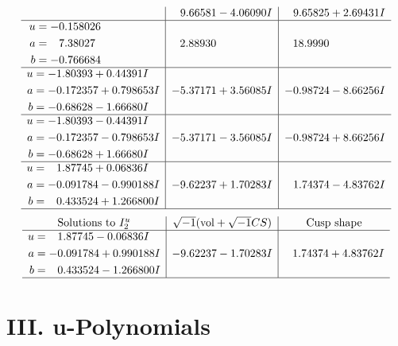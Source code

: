 \documentclass[1p]{elsarticle_modified}
\theoremstyle{definition}
\newcommand{\I}{\sqrt{-1}}
\begin{document}
$$\begin{array}{c|c|c}
 & \phantom{-}9.66581 - 4.06090 I & \phantom{-}9.65825 + 2.69431 I \\ \hline\begin{aligned}
u &= -0.158026\phantom{ +0.000000I} \\
a &= \phantom{-}7.38027\phantom{ +0.000000I} \\
b &= -0.766684\phantom{ +0.000000I}\end{aligned}
 & \phantom{-}2.88930\phantom{ +0.000000I} & \phantom{-}18.9990\phantom{ +0.000000I} \\ \hline\begin{aligned}
u &= -1.80393 + 0.44391 I \\
a &= -0.172357 + 0.798653 I \\
b &= -0.68628 - 1.66680 I\end{aligned}
 & -5.37171 + 3.56085 I & -0.98724 - 8.66256 I \\ \hline\begin{aligned}
u &= -1.80393 - 0.44391 I \\
a &= -0.172357 - 0.798653 I \\
b &= -0.68628 + 1.66680 I\end{aligned}
 & -5.37171 - 3.56085 I & -0.98724 + 8.66256 I \\ \hline\begin{aligned}
u &= \phantom{-}1.87745 + 0.06836 I \\
a &= -0.091784 - 0.990188 I \\
b &= \phantom{-}0.433524 + 1.266800 I\end{aligned}
 & -9.62237 + 1.70283 I & \phantom{-}1.74374 - 4.83762 I\\
 \hline 
 \end{array}$$\newpage$$\begin{array}{c|c|c}  
\text{Solutions to }I^u_{2}& \I (\text{vol} + \sqrt{-1}CS) & \text{Cusp shape}\\
 \hline 
\begin{aligned}
u &= \phantom{-}1.87745 - 0.06836 I \\
a &= -0.091784 + 0.990188 I \\
b &= \phantom{-}0.433524 - 1.266800 I\end{aligned}
 & -9.62237 - 1.70283 I & \phantom{-}1.74374 + 4.83762 I\\
 \hline 
 \end{array}$$\newpage
\newpage\renewcommand{\arraystretch}{1}
\centering \section*{ III. u-Polynomials}
\end{document}
